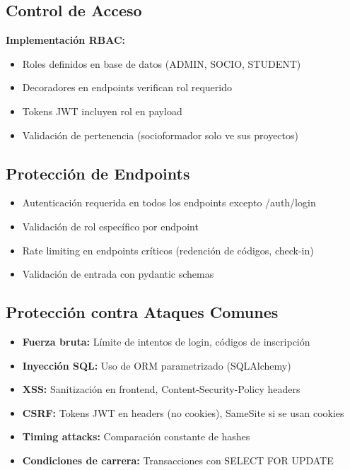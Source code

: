 \documentclass[12pt,a4paper]{article}
\begin{document}
\subsection{Control de Acceso}

\textbf{Implementación RBAC:}
\begin{itemize}[leftmargin=*]
    \item Roles definidos en base de datos (ADMIN, SOCIO, STUDENT)
    \item Decoradores en endpoints verifican rol requerido
    \item Tokens JWT incluyen rol en payload
    \item Validación de pertenencia (socioformador solo ve sus proyectos)
\end{itemize}

\subsection{Protección de Endpoints}

\begin{itemize}[leftmargin=*]
    \item Autenticación requerida en todos los endpoints excepto /auth/login
    \item Validación de rol específico por endpoint
    \item Rate limiting en endpoints críticos (redención de códigos, check-in)
    \item Validación de entrada con pydantic schemas
\end{itemize}

\subsection{Protección contra Ataques Comunes}

\begin{itemize}[leftmargin=*]
    \item \textbf{Fuerza bruta:} Límite de intentos de login, códigos de inscripción
    \item \textbf{Inyección SQL:} Uso de ORM parametrizado (SQLAlchemy)
    \item \textbf{XSS:} Sanitización en frontend, Content-Security-Policy headers
    \item \textbf{CSRF:} Tokens JWT en headers (no cookies), SameSite si se usan cookies
    \item \textbf{Timing attacks:} Comparación constante de hashes
    \item \textbf{Condiciones de carrera:} Transacciones con SELECT FOR UPDATE
\end{itemize}
\end{document}
